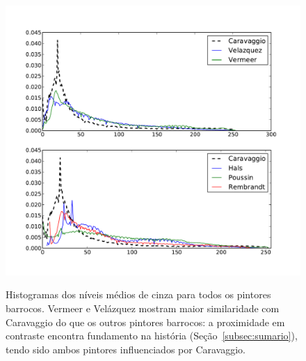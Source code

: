 \begin{figure}[h!]
\begin{center}
{    \centering
        \includegraphics[width=\columnwidth]{figs/chiaroscuro}}
      \caption{Histogramas dos níveis médios de cinza para todos os
        pintores barrocos. Vermeer e Velázquez mostram maior
        similaridade com Caravaggio do que os outros pintores
        barrocos: a proximidade em contraste encontra fundamento na
        história (Seção~\ref{subsec:sumario}), tendo sido ambos
        pintores influenciados por Caravaggio.}
        \label{fig:chiaroscuro}
  \end{center}
\end{figure}



